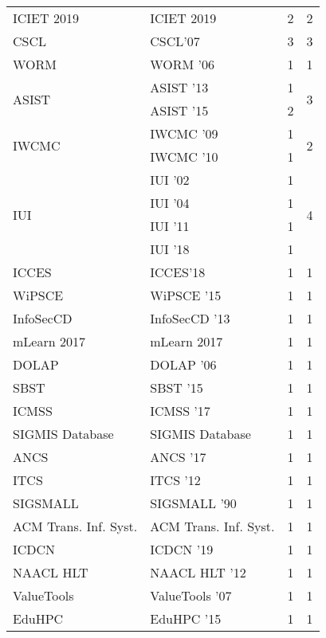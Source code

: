 \begin{table*}[t]
\begin{tabular}{llrr}
\multirow{1}{*}{ICIET 2019} & ICIET 2019 & 2 & \multirow{1}{*}{2}\\
\multirow{1}{*}{CSCL} & CSCL'07 & 3 & \multirow{1}{*}{3}\\
\multirow{1}{*}{WORM } & WORM '06 & 1 & \multirow{1}{*}{1}\\
\multirow{2}{*}{ASIST } & ASIST '13 & 1 & \multirow{2}{*}{3}\\
& ASIST '15 & 2 &\\
\multirow{2}{*}{IWCMC } & IWCMC '09 & 1 & \multirow{2}{*}{2}\\
& IWCMC '10 & 1 &\\
\multirow{4}{*}{IUI } & IUI '02 & 1 & \multirow{4}{*}{4}\\
& IUI '04 & 1 &\\
& IUI '11 & 1 &\\
& IUI '18 & 1 &\\
\multirow{1}{*}{ICCES} & ICCES'18 & 1 & \multirow{1}{*}{1}\\
\multirow{1}{*}{WiPSCE } & WiPSCE '15 & 1 & \multirow{1}{*}{1}\\
\multirow{1}{*}{InfoSecCD } & InfoSecCD '13 & 1 & \multirow{1}{*}{1}\\
\multirow{1}{*}{mLearn 2017} & mLearn 2017 & 1 & \multirow{1}{*}{1}\\
\multirow{1}{*}{DOLAP } & DOLAP '06 & 1 & \multirow{1}{*}{1}\\
\multirow{1}{*}{SBST } & SBST '15 & 1 & \multirow{1}{*}{1}\\
\multirow{1}{*}{ICMSS } & ICMSS '17 & 1 & \multirow{1}{*}{1}\\
\multirow{1}{*}{SIGMIS Database} & SIGMIS Database & 1 & \multirow{1}{*}{1}\\
\multirow{1}{*}{ANCS } & ANCS '17 & 1 & \multirow{1}{*}{1}\\
\multirow{1}{*}{ITCS } & ITCS '12 & 1 & \multirow{1}{*}{1}\\
\multirow{1}{*}{SIGSMALL } & SIGSMALL '90 & 1 & \multirow{1}{*}{1}\\
\multirow{1}{*}{ACM Trans. Inf. Syst.} & ACM Trans. Inf. Syst. & 1 & \multirow{1}{*}{1}\\
\multirow{1}{*}{ICDCN } & ICDCN '19 & 1 & \multirow{1}{*}{1}\\
\multirow{1}{*}{NAACL HLT } & NAACL HLT '12 & 1 & \multirow{1}{*}{1}\\
\multirow{1}{*}{ValueTools } & ValueTools '07 & 1 & \multirow{1}{*}{1}\\
\multirow{1}{*}{EduHPC } & EduHPC '15 & 1 & \multirow{1}{*}{1}\\

\end{tabular}
\end{table*}
